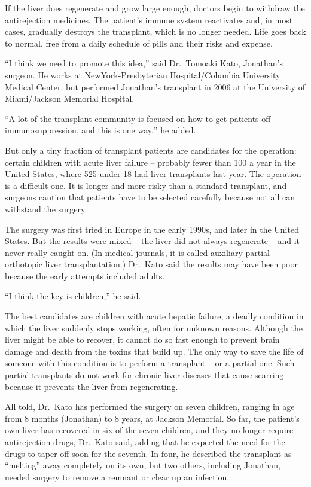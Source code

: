 ﻿\documentclass[12pt]{article}
\begin{document}
If the liver does regenerate and grow large enough, doctors begin to withdraw the antirejection
medicines. The patient's immune system reactivates and, in most cases, gradually destroys the
transplant, which is no longer needed. Life goes back to normal, free from a daily schedule of pills
and their risks and expense.

``I think we need to promote this idea,'' said Dr.~Tomoaki Kato, Jonathan's surgeon. He works at
NewYork-Presbyterian Hospital/Columbia University Medical Center, but performed Jonathan's
transplant in 2006 at the University of Miami/Jackson Memorial Hospital.

``A lot of the transplant community is focused on how to get patients off immunosuppression, and
this is one way,'' he added.

But only a tiny fraction of transplant patients are candidates for the operation: certain children
with acute liver failure -- probably fewer than 100 a year in the United States, where 525 under 18
had liver transplants last year. The operation is a difficult one. It is longer and more risky than
a standard transplant, and surgeons caution that patients have to be selected carefully because not
all can withstand the surgery.

The surgery was first tried in Europe in the early 1990s, and later in the United States. But the
results were mixed -- the liver did not always regenerate -- and it never really caught on. (In
medical journals, it is called auxiliary partial orthotopic liver transplantation.) Dr.~Kato said
the results may have been poor because the early attempts included adults.

``I think the key is children,'' he said.

The best candidates are children with acute hepatic failure, a deadly condition in which the liver
suddenly stops working, often for unknown reasons. Although the liver might be able to recover, it
cannot do so fast enough to prevent brain damage and death from the toxins that build up. The only
way to save the life of someone with this condition is to perform a transplant -- or a partial one.
Such partial transplants do not work for chronic liver diseases that cause scarring because it
prevents the liver from regenerating.

All told, Dr.~Kato has performed the surgery on seven children, ranging in age from 8 months
(Jonathan) to 8 years, at Jackson Memorial. So far, the patient's own liver has recovered in six of
the seven children, and they no longer require antirejection drugs, Dr.~Kato said, adding that he
expected the need for the drugs to taper off soon for the seventh. In four, he described the
transplant as ``melting'' away completely on its own, but two others, including Jonathan, needed
surgery to remove a remnant or clear up an infection.
\end{document}
